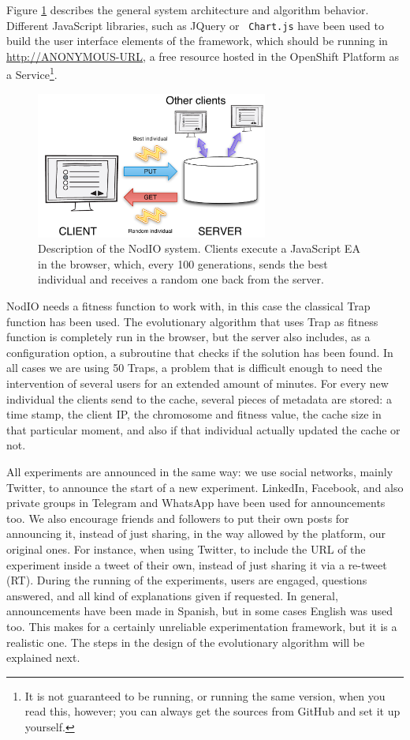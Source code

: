 \documentclass[runningheads,a4paper]{llncs}\usepackage[]{graphicx}\usepackage[]{color}
\begin{document}
Figure \ref{fig:system} describes the general system architecture and
algorithm behavior. Different JavaScript libraries, such as JQuery or {\tt
  Chart.js} have been used to build the user interface elements of the
framework, which should be running in \url{http://ANONYMOUS-URL}, 
a free resource hosted in the
OpenShift Platform as a Service\footnote{It is not guaranteed to be running,
or running the same version, when you read this, however; you can always get
the sources from GitHub and set it up yourself.}.
%
\begin{figure}[!t]
\centering
\includegraphics[width=3in]{system.pdf}
\caption{Description of the NodIO system. Clients execute a JavaScript EA
  in the browser, which, every 100 generations, sends the best
  individual and receives a random one back from the server.}
\label{fig:system}
\end{figure}

NodIO needs a fitness function to work with, in this case the classical Trap 
function \cite{Ackley1987} has been used. 
The evolutionary algorithm that uses Trap as fitness function is
completely run in the
browser, but the server also includes, as a configuration
option, a subroutine that checks if the solution has been
found. In all cases we are using 50 Traps, a problem
that is difficult enough to need the intervention of several users for
an extended amount of minutes. %
For every new individual the clients send to the cache, several
pieces of metadata are stored: a time stamp, the client IP, the chromosome and
fitness value, the cache size in that particular moment, and also if that
individual actually updated the cache or not. 

All experiments are announced in the same way: we use social networks,
mainly Twitter, to announce the start of a new experiment. LinkedIn,
Facebook, and also private groups in Telegram and WhatsApp have been
used for announcements too. We also encourage friends and followers to
put their own posts for announcing it, instead of just sharing, in
the way allowed by the platform, our original ones. For instance, when using Twitter, to include the URL of the experiment inside a tweet of their own, instead of just sharing it via a re-tweet (RT). During the running
of the experiments, users are engaged, questions answered, and all
kind of explanations given if requested. In general, announcements
have been made in Spanish, but in some cases English was used
too. This makes for a certainly unreliable experimentation framework,
but it is a realistic one. The steps in the design of the evolutionary
algorithm will be explained next.
\end{document}
